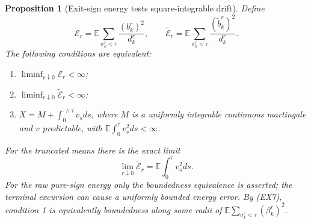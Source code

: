 \documentclass[11pt]{article}
\newtheorem{proposition}[theorem]{Proposition}
\theoremstyle{definition}\newtheorem{definition}[theorem]{Definition}
\theoremstyle{remark}\newtheorem{remark}[theorem]{Remark}
\begin{document}
\begin{proposition}[Exit-sign energy tests square-integrable drift]
\label{prop:exit-energy-ac}
Define
\[
 \mathcal E_r=\mathbb E\sum_{\sigma^r_k<\tau}
                            \frac{(b^r_k)^2}{d^r_k},\qquad
 \widetilde{\mathcal E}_r=\mathbb E\sum_{\sigma^r_k<\tau}
                       \frac{(\widetilde b^r_k)^2}{d^r_k}.
 \tag{EX9}
\]
The following conditions are equivalent:
\begin{enumerate}
\item $\liminf_{r\downarrow0}\mathcal E_r<\infty$;
\item $\liminf_{r\downarrow0}\widetilde{\mathcal E}_r<\infty$;
\item $X=M+\int_0^{\cdot\wedge\tau}v_sds$, where $M$ is a uniformly
 integrable continuous martingale and $v$ predictable, with
 $\mathbb E\int_0^\tau v_s^2ds<\infty$.
\end{enumerate}
For the truncated means there is the exact limit
\[
 \lim_{r\downarrow0}\widetilde{\mathcal E}_r
       =\mathbb E\int_0^\tau v_s^2ds.
 \tag{EX10}
\]
For the raw pure-sign energy only the boundedness equivalence is asserted;
the terminal excursion can cause a uniformly bounded energy error.
By (EX7), condition 1 is equivalently boundedness along some radii of
$\mathbb E\sum_{\sigma^r_k<\tau}(\beta^r_k)^2$.
\end{proposition}
\end{document}
